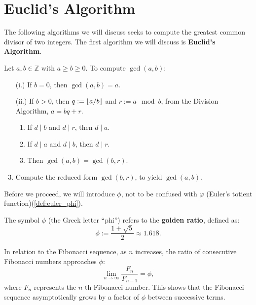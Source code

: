 \section{Euclid's Algorithm}
\label{sec:euclid}

\noindent
The following algorithms we will discuss seeks to compute the 
greatest common divisor of two integers. The first algorithm we will discuss is \textbf{Euclid's Algorithm}.

\begin{theo}

    Let $a,b \in \mathbb{Z}$ with $a \geq b \geq 0$. To compute $\gcd(a,b)$:
    \begin{enumerate}
        \item[(i.)] If $b = 0$, then $\gcd(a,b) = a$.
        \item[(ii.)] If $b >0$, then $q:= \lfloor a/b\rfloor$ and $r:= a \mod b$, from the Division Algorithm, $a = bq + r$.
        \begin{enumerate}
            \item If $d \mid b$ and $d \mid r$, then $d \mid a$.
            \item If $d \mid a$ and $d \mid b$, then $d \mid r$.
            \item Then $\gcd(a,b) = \gcd(b,r)$.
        \end{enumerate} 
        \item Compute the reduced form $\gcd(b,r)$, to yield $\gcd(a,b)$.
    \end{enumerate}
\end{theo}

\noindent
Before we proceed, we will introduce $\phi$, not to be confused with $\varphi$ (Euler's totient function)(\ref{def:euler_phi}).

\begin{Def}

    The symbol $\phi$ (the Greek letter ``phi'') refers to the \textbf{golden ratio}, defined as:
    \[
        \phi := \frac{1 + \sqrt{5}}{2} \approx 1.618.
    \]

    \noindent
    In relation to the Fibonacci sequence, as \(n\) increases, the ratio of consecutive Fibonacci numbers approaches $\phi$:
    \[
        \lim_{n \to \infty} \frac{F_n}{F_{n-1}} = \phi,
    \]
    where $F_n$ represents the $n$-th Fibonacci number. This shows that the Fibonacci sequence asymptotically grows by a factor of $\phi$ between successive terms.
    
\end{Def}

